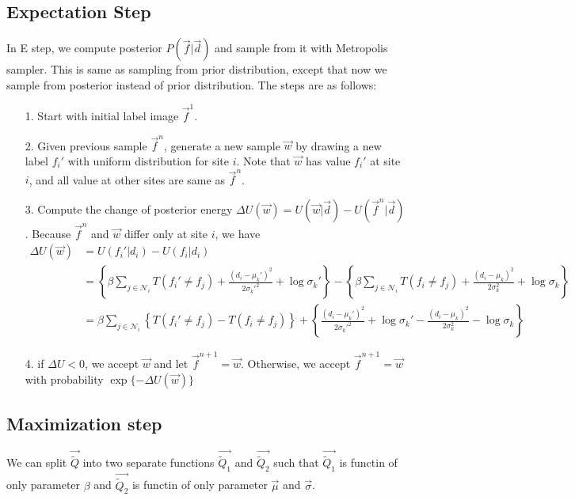 \documentclass{article}
\begin{document}
\subsection{Expectation Step}
In E step, we compute posterior $P(\vec f | \vec d)$ and sample from it with Metropolis sampler. This is same as sampling from prior distribution, except that now we sample from posterior instead of prior distribution. The steps are as follows:
\begin{itemize}
  \item[1.] Start with initial label image $\vec f^1$.
  \item[2.] Given previous sample $\vec f^{n}$, generate a new sample $\vec w$ by drawing a new label  $f_i'$  with uniform distribution for site $i$. Note that $\vec w$ has value $f_i'$ at site $i$, and all value at other sites are same as $\vec f^{n}$. 
   \item[3.] Compute the change of posterior energy $\Delta U(\vec w) = U(\vec w | \vec d) - U(\vec f^n | \vec d)$. Because $\vec f^{n}$ and $\vec w$ differ only at site $i$, we have
     \begin{align*}
       \Delta U(\vec w) &= U(f_i'| d_i) - U(f_i | d_i) \\
       &= \left \{\beta \sum_{j\in \mathcal{N}_i} T(f_i' \neq f_j) + \frac{(d_i - \mu_k')^2}{2\sigma_k'^2} + \log \sigma_k' \right \}
- \left \{\beta \sum_{j\in \mathcal{N}_i} T(f_i \neq f_j) + \frac{(d_i - \mu_k)^2}{2\sigma_k^2} + \log \sigma_k \right \} \\
       &= \beta \sum_{j \in \mathcal{N}_i} \left \{  T(f_i' \neq f_j) - T(f_i \neq f_j) \right \} + \left \{ \frac{(d_i - \mu_k')^2}{2\sigma_k'^2} + \log \sigma_k' - \frac{(d_i - \mu_k)^2}{2\sigma_k^2} - \log \sigma_k  \right \}
     \end{align*}
     \item[4.] if $\Delta U < 0$, we accept $\vec w$ and let $\vec f^{n+1} = \vec w$. Otherwise, we accept $\vec f^{n+1} = \vec w$ with probability $\exp \{ - \Delta U(\vec w)\}$
\end{itemize}


\subsection{Maximization step}
We can split $\vec {\widetilde Q}$ into two separate functions $\vec {\widetilde Q_1}$ and $\vec {\widetilde Q_2}$ such that $\vec {\widetilde Q_1 }$ is functin of only parameter $\beta$ and $\vec {\widetilde Q_2}$ is functin of only parameter $\vec \mu$ and $\vec \sigma$. 
\end{document}
